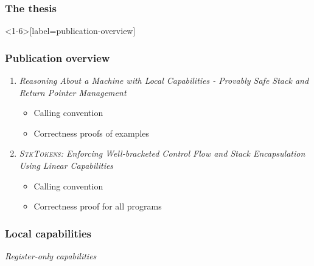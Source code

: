 \documentclass[14pt]{beamer}
\begin{document}



\begin{frame}
  \frametitle{The thesis}
\end{frame}

\begin{frame}<1-6>[label=publication-overview]
  \frametitle{Publication overview}
  \begin{enumerate}
  \item \textit{Reasoning About a Machine with \alert<3>{Local Capabilities} - Provably Safe Stack and Return Pointer Management}
    \begin{itemize}
    \item<2-> Calling convention
    \item<5-> Correctness proofs of examples
    \end{itemize}
  \item \alert<8>{\textit{\textsc{StkTokens}: Enforcing Well-bracketed Control Flow and Stack Encapsulation Using \alert<4>{Linear Capabilities}}}
    \begin{itemize}
    \item<2-> Calling convention
    \item<6-> Correctness proof for all programs
    \end{itemize}
  \end{enumerate}               
\end{frame}
\begin{frame}
  \frametitle{Local capabilities}
    \Large
    \textit{Register-only capabilities}
\end{frame}
\end{document}
